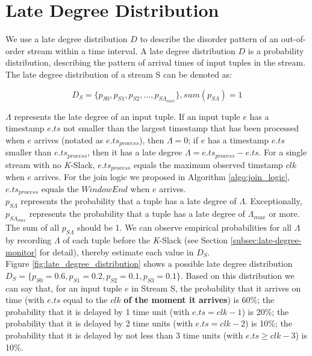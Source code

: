 \documentclass[a4paper, 11pt, twoside]{report}
\begin{document}
\section{Late Degree Distribution}
\label{sec:late-degree-distribution}

We use a late degree distribution $D$ to describe the disorder pattern of an out-of-order stream within a time interval. A late degree distribution $D$ is a probability distribution, describing the pattern of arrival times of input tuples in the stream. The late degree distribution of a stream S can be denoted as:

$$D_S = \{p_{S0}, p_{S1}, p_{S2}, ..., p_{S\Lambda_{max}}\}, sum(p_{S\Lambda})=1$$

$\Lambda$ represents the late degree of an input tuple. If an input tuple $e$ has a timestamp $e.ts$ not smaller than the largest timestamp that has been processed when $e$ arrives (notated as $e.ts_{process}$), then $\Lambda=0$; if $e$ has a timestamp $e.ts$ smaller than $e.ts_{process}$, then it has a late degree $\Lambda=e.ts_{process}-e.ts$. For a single stream with no \textit{K}-Slack, $e.ts_{process}$ equals the maximum observed timstamp $clk$ when $e$ arrives. For the join logic we proposed in Algorithm \ref{algo:join_logic}, $e.ts_{process}$ equals the $WindowEnd$ when $e$ arrives.\\

$p_{S\Lambda}$ represents the probability that a tuple has a late degree of $\Lambda$. Exceptionally, $p_{S\Lambda_{max}}$ represents the probability that a tuple has a late degree of $\Lambda_{max}$ or more. The sum of all $p_{S\Lambda}$ should be 1. We can observe empirical probabilities for all $\Lambda$ by recording $\Lambda$ of each tuple before the \textit{K}-Slack (see Section \ref{subsec:late-degree-monitor} for detail), thereby estimate each value in $D_S$.\\

Figure \ref{fig:late_degree_distribution} shows a possible late degree distribution $D_S = \{p_{S0}=0.6, p_{S1}=0.2, p_{S2}=0.1, p_{S3}=0.1\}$. Based on this distribution we can say that, for an input tuple $e$ in Stream S, the probability that it arrives on time (with $e.ts$ equal to the $clk$ \textbf{of the moment it arrives}) is 60\%; the probability that it is delayed by 1 time unit (with $e.ts=clk-1$) is 20\%; the probability that it is delayed by 2 time units (with $e.ts=clk-2$) is 10\%; the probability that it is delayed by not less than 3 time units (with $e.ts\geq clk-3$) is 10\%.\\
\end{document}
